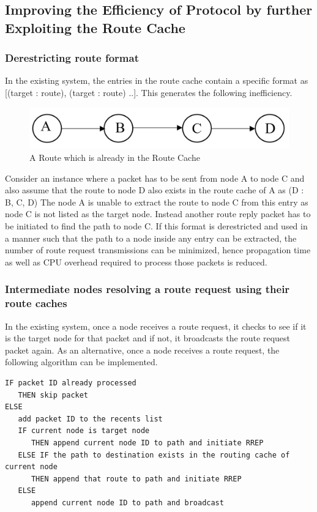 \documentclass[a4paper,11pt]{article}%
\begin{document}


\subsection{Improving the Efficiency of Protocol by further Exploiting the Route Cache}

\subsubsection{Derestricting route format}
In the existing system, the entries in the route cache contain a specific format as [(target : route), (target : route) ..].
This generates the following inefficiency.
\begin{figure}[!h]
	\centering
	\includegraphics[scale = 0.4]{figures/route}
	\caption{A Route which is already in the Route Cache}
\end{figure}

Consider an instance where a packet has to be sent from node A to node C and also assume that the route to node D also exists in the route cache of A as (D : B, C, D)
The node A is unable to extract the route to node C from this entry as node C is not listed as the target node. Instead another route reply packet has to be initiated to find the path to node C.
If this format is derestricted and used in a manner such that the path to a node inside any entry can be extracted, the number of route request transmissions can be minimized, hence propagation time as well as CPU overhead required to process those packets is reduced.

\subsubsection{Intermediate nodes resolving a route request using their route caches}
In the existing system, once a node receives a route request, it checks to see if it is the target node for that packet and if not, it broadcasts the route request packet again.
As an alternative, once a node receives a route request, the following algorithm can be implemented.

\begin{verbatim}
IF packet ID already processed
   THEN skip packet
ELSE
   add packet ID to the recents list
   IF current node is target node
      THEN append current node ID to path and initiate RREP
   ELSE IF the path to destination exists in the routing cache of current node
      THEN append that route to path and initiate RREP
   ELSE
      append current node ID to path and broadcast
\end{verbatim}
\end{document}
